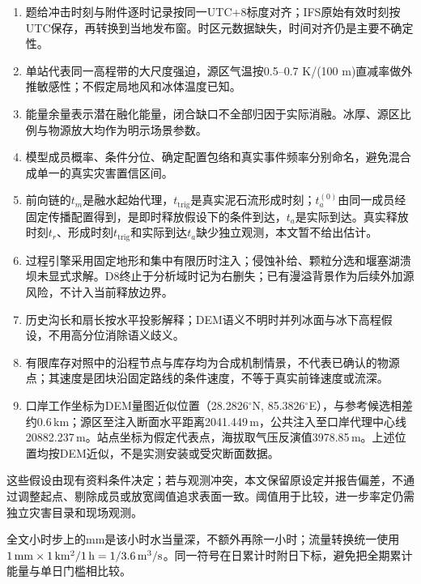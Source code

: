 \begin{enumerate}
\item 题给冲击时刻与附件逐时记录按同一UTC+8标度对齐；IFS原始有效时刻按UTC保存，再转换到当地发布窗。时区元数据缺失，时间对齐仍是主要不确定性。
\item 单站代表同一高程带的大尺度强迫，源区气温按0.5--0.7 K/(100 m)直减率做外推敏感性；不假定局地风和冰体温度已知。
\item 能量余量表示潜在融化能量，闭合缺口不全部归因于实际消融。冰厚、源区比例与物源放大均作为明示场景参数。
\item 模型成员概率、条件分位、确定配置包络和真实事件频率分别命名，避免混合成单一的真实灾害置信区间。
\item 前向链的$t_m$是融水起始代理，$t_{\mathrm{trig}}$是真实泥石流形成时刻；$t_a^{(0)}$由同一成员经固定传播配置得到，是即时释放假设下的条件到达，$t_a$是实际到达。真实释放时刻$t_r$、形成时刻$t_{\mathrm{trig}}$和实际到达$t_a$缺少独立观测，本文暂不给出估计。
\item 过程引擎采用固定地形和集中有限历时注入；侵蚀补给、颗粒分选和堰塞湖溃坝未显式求解。D8终止于分析域时记为右删失；已有漫溢背景作为后续外加源风险，不计入当前释放边界。
\item 历史沟长和扇长按水平投影解释；DEM语义不明时并列冰面与冰下高程假设，不用高分位消除语义歧义。
\item 有限库存对照中的沿程节点与库存均为合成机制情景，不代表已确认的物源点；其速度是团块沿固定路线的条件速度，不等于真实前锋速度或流深。
\item 口岸工作坐标为DEM量图近似位置（28.2826$^\circ$N, 85.3826$^\circ$E），与参考候选相差约0.6\,km；源区至注入断面水平距离2041.449\,m，公共注入至口岸代理中心线20882.237\,m。站点坐标为假定代表点，海拔取气压反演值3978.85\,m。上述位置均按DEM近似，不是实测安装或受灾断面数据。
\end{enumerate}

这些假设由现有资料条件决定；若与观测冲突，本文保留原设定并报告偏差，不通过调整起点、剔除成员或放宽阈值追求表面一致。阈值用于比较，进一步率定仍需独立灾害目录和现场观测。

全文小时步上的mm是该小时水当量深，不额外再除一小时；流量转换统一使用$1\,\mathrm{mm}\times1\,\mathrm{km^2}/1\,\mathrm{h}=1/3.6\,\mathrm{m^3/s}$。同一符号在日累计时附日下标，避免把全期累计能量与单日门槛相比较。
